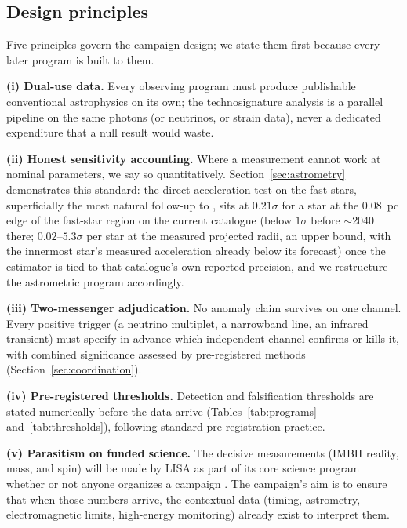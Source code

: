 \documentclass[11pt]{article}
\begin{document}
\subsection{Design principles}
\label{sec:principles}

Five principles govern the campaign design; we state them first because every later program is built to them.

\textbf{(i) Dual-use data.} Every observing program must produce publishable conventional astrophysics on its own; the technosignature analysis is a parallel pipeline on the same photons (or neutrinos, or strain data), never a dedicated expenditure that a null result would waste.

\textbf{(ii) Honest sensitivity accounting.} Where a measurement cannot work at nominal parameters, we say so quantitatively. Section~\ref{sec:astrometry} demonstrates this standard: the direct acceleration test on the fast stars, superficially the most natural follow-up to \citet{Haberle2024Nature}, sits at $0.21\sigma$ for a star at the $0.08$~pc edge of the fast-star region on the current catalogue (below $1\sigma$ before $\sim$2040 there; $0.02$--$5.3\sigma$ per star at the measured projected radii, an upper bound, with the innermost star's measured acceleration already below its forecast) once the estimator is tied to that catalogue's own reported precision, and we restructure the astrometric program accordingly.

\textbf{(iii) Two-messenger adjudication.} No anomaly claim survives on one channel. Every positive trigger (a neutrino multiplet, a narrowband line, an infrared transient) must specify in advance which independent channel confirms or kills it, with combined significance assessed by pre-registered methods (Section~\ref{sec:coordination}).

\textbf{(iv) Pre-registered thresholds.} Detection and falsification thresholds are stated numerically before the data arrive (Tables~\ref{tab:programs} and~\ref{tab:thresholds}), following standard pre-registration practice.

\textbf{(v) Parasitism on funded science.} The decisive measurements (IMBH reality, mass, and spin) will be made by LISA as part of its core science program whether or not anyone organizes a campaign \citep{Colpi2024,Babak2017}. The campaign's aim is to ensure that when those numbers arrive, the contextual data (timing, astrometry, electromagnetic limits, high-energy monitoring) already exist to interpret them.
\end{document}
